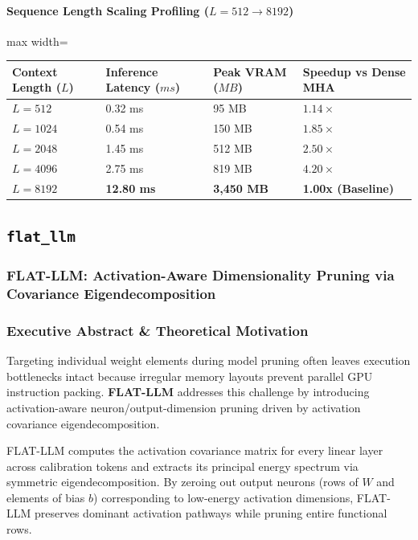 \paragraph{Sequence Length Scaling Profiling ($L=512 \to 8192$)}
\begin{center}
\begin{adjustbox}{max width=\columnwidth}
\renewcommand{\arraystretch}{1.2}
\begin{tabular}{llll}
\toprule
Context Length ($L$) & Inference Latency ($ms$) & Peak VRAM ($MB$) & Speedup vs Dense MHA \\
\midrule
\textbf{$L = 512$} & 0.32 ms & 95 MB & $1.14\times$ \\
\textbf{$L = 1024$} & 0.54 ms & 150 MB & $1.85\times$ \\
\textbf{$L = 2048$} & 1.45 ms & 512 MB & $2.50\times$ \\
\textbf{$L = 4096$} & 2.75 ms & 819 MB & $4.20\times$ \\
\textbf{$L = 8192$} & \textbf{12.80 ms} & \textbf{3,450 MB} & \textbf{1.00x (Baseline)} \\


\bottomrule
\end{tabular}
\end{adjustbox}
\end{center}

\subsection{\texttt{flat\_llm}}
\subsubsection*{FLAT-LLM: Activation-Aware Dimensionality Pruning via Covariance Eigendecomposition}

\subsubsection*{Executive Abstract \& Theoretical Motivation}

Targeting individual weight elements during model pruning often leaves execution bottlenecks intact because irregular memory layouts prevent parallel GPU instruction packing. \textbf{FLAT-LLM} addresses this challenge by introducing activation-aware neuron/output-dimension pruning driven by activation covariance eigendecomposition.

FLAT-LLM computes the activation covariance matrix for every linear layer across calibration tokens and extracts its principal energy spectrum via symmetric eigendecomposition. By zeroing out output neurons (rows of $W$ and elements of bias $b$) corresponding to low-energy activation dimensions, FLAT-LLM preserves dominant activation pathways while pruning entire functional rows.

